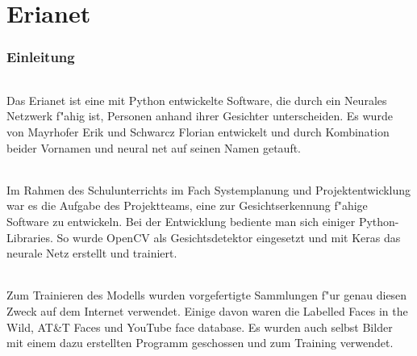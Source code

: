 \documentclass[12pt]{article}
\begin{document}
\tableofcontents
\newpage

\part{Erianet}
\section{Einleitung}
\paragraph{}
Das Erianet ist eine mit Python entwickelte Software, die
durch ein Neurales Netzwerk f"ahig ist,
Personen anhand ihrer Gesichter unterscheiden.
Es wurde von Mayrhofer Erik und Schwarcz Florian
entwickelt und durch Kombination beider Vornamen und \glqq neural net\grqq{}
auf seinen Namen getauft.
\paragraph{}
Im Rahmen des Schulunterrichts im Fach \glqq Systemplanung und Projektentwicklung\grqq{}
war es die Aufgabe des Projektteams, eine zur Gesichtserkennung
f"ahige Software zu entwickeln.
Bei der Entwicklung bediente man sich einiger Python-Libraries.
So wurde OpenCV als Gesichtsdetektor eingesetzt und mit Keras das neurale
Netz erstellt und trainiert.
\paragraph{}
Zum Trainieren des Modells wurden vorgefertigte Sammlungen f"ur genau diesen
Zweck auf dem Internet verwendet. Einige davon waren die \glqq Labelled Faces in the Wild\grqq{},
\glqq AT\&T Faces\grqq{} und \glqq YouTube face database\grqq{}. Es wurden
auch selbst Bilder mit einem dazu erstellten Programm geschossen und zum Training verwendet.
\end{document}
